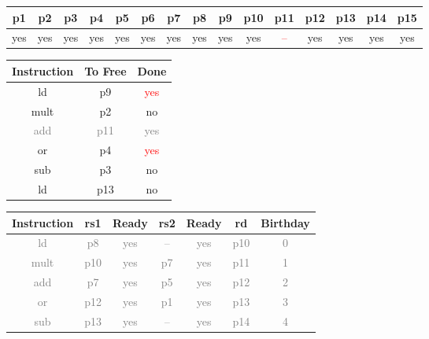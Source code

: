 \documentclass[12pt]{article}
\begin{document}
\begin{enumerate}
			\begin{table}[H]
				\begin{tabular}{|c|c|c|c|c|c|c|c|c|c|c|c|c|c|c|}
					\hline
					p1 & p2 & p3 & p4 & p5 & p6 & p7 & p8 & p9 & p10 & p11 & p12 & p13 & p14 & p15\\
					\hline
					yes & yes & yes & yes & yes & yes & yes & yes & yes & yes & \textcolor{red}{--} & yes & yes & yes & yes\\
					\hline
				\end{tabular}
			\end{table}
			\begin{table}[H]
				\begin{tabular}{|c|c|c|}
					\hline
					Instruction & To Free & Done\\
					\hline
					ld & p9 & \textcolor{red}{yes}\\
					\hline
					mult & p2 & no\\
					\hline
					\textcolor{gray}{add} & \textcolor{gray}{p11} & \textcolor{gray}{yes}\\
					\hline
					or & p4 & \textcolor{red}{yes}\\
					\hline
					sub & p3 & no\\
					\hline
					ld & p13 & no\\
					\hline
				\end{tabular}
				\hfill
				\begin{tabular}{|c|c|c|c|c|c|c|}
					\hline
					Instruction & rs1 & Ready & rs2 & Ready & rd & Birthday\\
					\hline
					\textcolor{gray}{ld} & \textcolor{gray}{p8} & \textcolor{gray}{yes} & \textcolor{gray}{--} & \textcolor{gray}{yes} & \textcolor{gray}{p10} & \textcolor{gray}{0}\\
					\hline
					\textcolor{gray}{mult} & \textcolor{gray}{p10} & \textcolor{gray}{yes} & \textcolor{gray}{p7} & \textcolor{gray}{yes} & \textcolor{gray}{p11} & \textcolor{gray}{1}\\
					\hline
					\textcolor{gray}{add} & \textcolor{gray}{p7} & \textcolor{gray}{yes} & \textcolor{gray}{p5} & \textcolor{gray}{yes} & \textcolor{gray}{p12} & \textcolor{gray}{2}\\
					\hline
					\textcolor{gray}{or} & \textcolor{gray}{p12} & \textcolor{gray}{yes} & \textcolor{gray}{p1} & \textcolor{gray}{yes} & \textcolor{gray}{p13} & \textcolor{gray}{3}\\
					\hline
					\textcolor{gray}{sub} & \textcolor{gray}{p13} & \textcolor{gray}{yes} & \textcolor{gray}{--} & \textcolor{gray}{yes} & \textcolor{gray}{p14} & \textcolor{gray}{4}\\

\end{tabular}
\end{table}
\end{enumerate}
\end{document}

